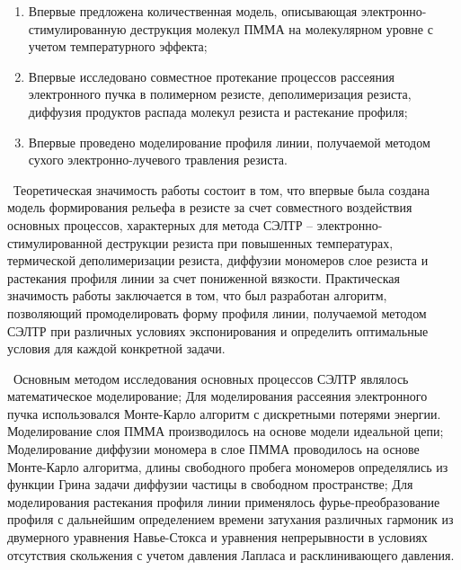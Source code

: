 \novelty
\begin{enumerate}
  \item Впервые предложена количественная модель, описывающая электронно-стимулированную деструкция молекул ПММА на молекулярном уровне с учетом температурного эффекта;
  \item Впервые исследовано совместное протекание процессов рассеяния электронного пучка в полимерном резисте, деполимеризация резиста, диффузия продуктов распада молекул резиста и растекание профиля;
  \item Впервые проведено моделирование профиля линии, получаемой методом сухого электронно-лучевого травления резиста.
\end{enumerate}

\influence\
Теоретическая значимость работы состоит в том, что впервые была создана модель формирования рельефа в резисте за счет совместного воздействия основных процессов, характерных для метода СЭЛТР – электронно-стимулированной деструкции резиста при повышенных температурах, термической деполимеризации резиста, диффузии мономеров слое резиста и растекания профиля линии за счет пониженной вязкости. Практическая значимость работы заключается в том, что был разработан алгоритм, позволяющий промоделировать форму профиля линии, получаемой методом СЭЛТР при различных условиях экспонирования и определить оптимальные условия для каждой конкретной задачи.

\methods\
Основным методом исследования основных процессов СЭЛТР являлось математическое моделирование; Для моделирования рассеяния электронного пучка использовался Монте-Карло алгоритм с дискретными потерями энергии. Моделирование слоя ПММА производилось на основе модели идеальной цепи; Моделирование диффузии мономера в слое ПММА проводилось на основе Монте-Карло алгоритма, длины свободного пробега мономеров определялись из функции Грина задачи диффузии частицы в свободном пространстве; Для моделирования растекания профиля линии применялось фурье-преобразование профиля с дальнейшим определением времени затухания различных гармоник из двумерного уравнения Навье-Стокса и уравнения непрерывности в условиях отсутствия скольжения с учетом давления Лапласа и расклинивающего давления.

